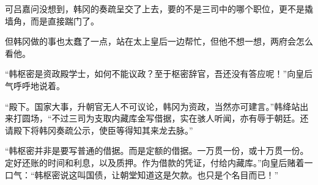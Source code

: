 可吕嘉问没想到，韩冈的奏疏呈交了上去，要的不是三司中的哪个职位，更不是撬墙角，而是直接踹门了。

但韩冈做的事也太蠢了一点，站在太上皇后一边帮忙，但他不想一想，两府会怎么看他。

“韩枢密是资政殿学士，如何不能议政？至于枢密辞官，吾还没有答应呢！”向皇后气呼呼地说着。

“殿下。国家大事，升朝官无人不可议论，韩冈为资政，当然亦可建言。”韩绛站出来打圆场，“不过三司为支取内藏库金写借据，实在骇人听闻，亦有辱于朝廷。还请殿下将韩冈奏疏公示，使臣等得知其来龙去脉。”

“韩枢密并非是要写普通的借据。而是定额的借据。一万贯一份，或十万贯一份。定好还账的时间和利息，以及质押。作为借款的凭证，付给内藏库。”向皇后赌着一口气：“韩枢密说这叫国债，让朝堂知道这是欠款。也只是个名目而已！”

